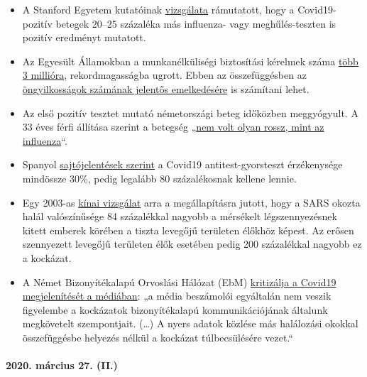 \begin{itemize}
\tightlist
\item
  A Stanford Egyetem kutatóinak
  \href{https://medium.com/@nigam/higher-co-infection-rates-in-covid19-b24965088333}{vizsgálata}
  rámutatott, hogy a Covid19-pozitív betegek 20--25 százaléka más
  influenza- vagy meghűlés-teszten is pozitív eredményt mutatott.
\item
  Az Egyesült Államokban a munkanélküliségi biztosítási kérelmek száma
  \href{https://www.businessinsider.com/us-weekly-jobless-claims-record-coronavirus-unemployment-insurance-labor-recession-2020-3}{több
  3 millióra}, rekordmagasságba ugrott. Ebben az összefüggésben az
  \href{https://twitter.com/KoenSwinkels/status/1243066532390977544}{öngyilkosságok
  számának jelentős emelkedésére} is számítani lehet.
\item
  Az első pozitív tesztet mutató németországi beteg időközben
  meggyógyult. A 33 éves férfi állítása szerint a betegség
  „\href{https://www.br.de/nachrichten/bayern/coronavirus-patient-nummer-1-wie-ich-die-quarantaene-erlebte,Rrm4Ul8}{nem
  volt olyan rossz, mint az influenza}``.
\item
  Spanyol
  \href{https://elpais.com/sociedad/2020-03-25/los-test-rapidos-de-coronavirus-comprados-en-china-no-funcionan.html}{sajtójelentések
  szerint} a Covid19 antitest-gyorsteszt érzékenysége mindössze 30\%,
  pedig legalább 80 százalékosnak kellene lennie.
\item
  Egy 2003-as
  \href{https://ehjournal.biomedcentral.com/articles/10.1186/1476-069X-2-15}{kínai
  vizsgálat} arra a megállapításra jutott, hogy a SARS okozta halál
  valószínűsége 84 százalékkal nagyobb a mérsékelt légszennyezésnek
  kitett emberek körében a tiszta levegőjű területen élőkhöz képest. Az
  erősen szennyezett levegőjű területen élők esetében pedig 200
  százalékkal nagyobb ez a kockázat.
\item
  A Német Bizonyítékalapú Orvoslási Hálózat (EbM)
  \href{https://www.ebm-netzwerk.de/de/veroeffentlichungen/covid-19}{kritizálja
  a Covid19 megjelenítését a médiában}: „a média beszámolói egyáltalán
  nem veszik figyelembe a kockázatok bizonyítékalapú kommunikációjának
  általunk megkövetelt szempontjait. (\ldots{}) A nyers adatok közlése
  más halálozási okokkal összefüggésbe helyezés nélkül a kockázat
  túlbecsülésére vezet.``
\end{itemize}

\hypertarget{2020-muxe1rcius-27-ii}{%
\paragraph{2020. március 27. (II.)}\label{2020-muxe1rcius-27-ii}}

